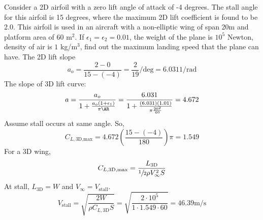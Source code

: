 \documentclass[12pt, twocolumn, letterpaper]{article}
\begin{document}
\hline
Consider a 2D airfoil with a zero lift angle of attack of -4 degrees. The stall angle for this airfoil is 15 degrees, where the maximum 2D lift coefficient is found to be 2.0. This airfoil is used in an aircraft with a non-elliptic wing of span 20m and platform area of 60 m$^2$. If $\epsilon_1=\epsilon_2=0.01$, the weight of the plane is $10^5$ Newton, density of air is $1$ kg/m$^3$, find out the maximum landing speed that the plane can have. The 2D lift slope
\begin{equation*}
    a_o=\frac{2-0}{15-(-4)}=\frac{2}{19}/\text{deg}=6.0311/\text{rad}
\end{equation*}
The slope of 3D lift curve:
\begin{equation*}
    a=\frac{a_o}{1+\frac{a_o(1+\epsilon_1)}{\pi\AR}}=\frac{6.031}{1+\frac{(6.031)(1.01)}{\pi\frac{20^2}{60}}}=4.672
\end{equation*}
Assume stall occurs at same angle. So,
\begin{equation*}
    C_{L,\text{3D,max}}=4.672\left(\frac{15-(-4)}{180}\right)\pi=1.549
\end{equation*}
For a 3D wing,
\begin{equation*}
    C_{L,\text{3D,max}}=\frac{L_\text{3D}}{\sfrac{1}{2}\rho V_\infty^2 S}
\end{equation*}
At stall, $L_\text{3D}=W$ and $V_\infty=V_\text{stall}$.
\begin{equation*}
    V_\text{stall}=\sqrt{\frac{2W}{\rho C_{L,\text{3D}}S}}=\sqrt{\frac{2\cdot10^5}{1\cdot1.549\cdot60}}=46.39\text{m/s}
\end{equation*}
\end{document}
